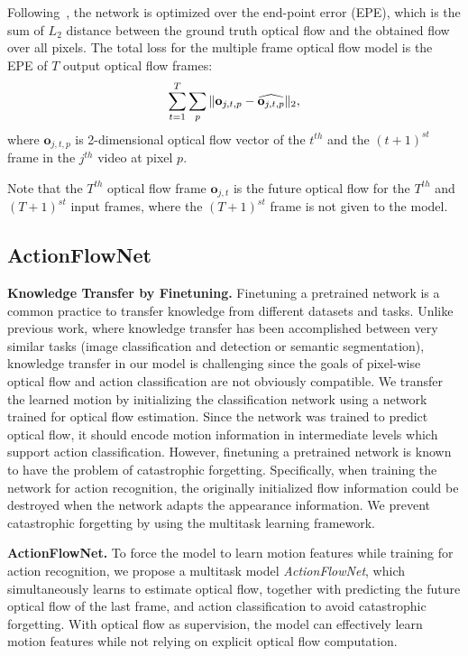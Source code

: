 \documentclass[10pt,twocolumn,letterpaper]{article}
\begin{document}
Following~\cite{FischerDIHHGSCB15}, the network is optimized over the end-point error (EPE), which is the sum of $L_2$ distance between the ground truth optical flow and the obtained flow over all pixels.
The total loss for the multiple frame optical flow model is the EPE of $T$ output optical flow frames:
\vspace{-.5em}
\begin{equation}
  \sum_{t=1}^T\sum_{p} \|\mathbf{o}_{j,t,p} - \widehat{\mathbf{o}_{j,t,p}} \|_2,
	\label{eq:loss_epe}
  \vspace{-.5em}
\end{equation}
where $\mathbf{o}_{j,t,p}$ is 2-dimensional optical flow vector of the $t^{th}$ and the $(t+1)^{st}$ frame in the $j^{th}$ video at pixel $p$.

Note that the $T^{th}$ optical flow frame $\mathbf{o}_{j,t}$ is the future optical flow for the $T^{th}$ and $(T+1)^{st}$ input frames, where the $(T+1)^{st}$ frame is not given to the model.



\subsection{ActionFlowNet}
\label{sec:multi}
\noindent \textbf{Knowledge Transfer by Finetuning.}
Finetuning a pretrained network is a common practice to transfer knowledge from different datasets and tasks.
Unlike previous work, where knowledge transfer has been accomplished between very similar tasks (image classification and detection or semantic segmentation), knowledge transfer in our model is challenging since the goals of pixel-wise optical flow and action classification are not obviously compatible. 
We transfer the learned motion by initializing the classification network using a network trained for optical flow estimation.
Since the network was trained to predict optical flow, it should encode motion information in intermediate levels which support action classification.
However, finetuning a pretrained network is known to have the problem of catastrophic forgetting.
Specifically, when training the network for action recognition, the originally initialized flow information could be destroyed when the network adapts the appearance information.
We prevent catastrophic forgetting by using the multitask learning framework.

\noindent \textbf{ActionFlowNet.}
To force the model to learn motion features while training for action recognition, we propose a multitask model \emph{ActionFlowNet}, which simultaneously learns to estimate optical flow, together with predicting the future optical flow of the last frame, and action classification to avoid catastrophic forgetting.
With optical flow as supervision, the model can effectively learn motion features while not relying on explicit optical flow computation.
\end{document}
